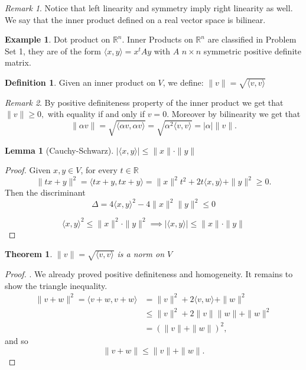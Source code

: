 \documentclass[11pt,openany]{book}
\theoremstyle{plain}
\newtheorem{theorem}{Theorem}[chapter]
\newtheorem{lemma}{Lemma}[chapter]
\theoremstyle{definition}
\newtheorem{definition}{Definition}[chapter]
\newtheorem{example}{Example}[chapter]
\theoremstyle{remark}
\newtheorem{remark}{Remark}[chapter]
\newcommand{\R}{\mathbb{R}}
\newcommand{\inner}[1]{\langle #1 \rangle}
\begin{document}
\begin{remark}\rm
Notice that left linearity and symmetry imply right linearity as well. We say that the inner product defined on a real vector space is bilinear.
\end{remark}
\begin{example}
    Dot product on $\mathbb R^n$. Inner Products on $\mathbb R^n$ are classified in Problem Set 1, they are of the form $\langle x, y\rangle=x^tAy$ with $A$ $n\times n$ symmetric positive definite matrix.
\end{example}
\begin{definition}
    Given an inner product on $V$, we define: $\|v\| = \sqrt{\langle v, v\rangle}$
\end{definition}

\begin{remark}\rm
By positive definiteness property of the inner product we get that $\|v\|\geq 0,$ with equality if and only if $v=0$. Moreover by bilinearity we get that
$$\|\alpha v\|=\sqrt{\langle \alpha v,\alpha v\rangle}=\sqrt{\alpha^2\langle v,v\rangle}=|\alpha| \|v\|.$$
\end{remark}

\begin{lemma}[Cauchy-Schwarz]
    $|\langle x,y \rangle| \le \|x\| \cdot \|y\|$    
\end{lemma}
\begin{proof} Given $x,y\in V$, for every $t\in \R$
    \[\|tx+y\|^2 = \langle tx+y, tx+y\rangle = \|x\|^2t^2+2t\langle x,y \rangle +\|y\|^2 \ge 0.\]
Then the discriminant   
    \[\Delta = 4 \langle x,y \rangle ^2 - 4\|x\|^2\|y\|^2 \leq  0 \]
    
    \[\langle x,y \rangle^2 \le \|x\|^2\cdot \|y\|^2 \implies |\langle x,y \rangle| \le \|x\|\cdot\|y\| \]
\end{proof}

\begin{theorem}
    $\|v\|=\sqrt{\langle v,v\rangle}$ is a norm on $V$
\end{theorem}

\begin{proof}.
    We already proved positive definiteness and homogeneity. It remains to show the triangle inequality.
 \begin{align*}
     \|v+w\|^2 = \inner{v+w, v+w} &= \|v\|^2+2\inner{v,w}+\|w\|^2 \\&\le \|v\|^2+2\|v\|\|w\|+\|w\|^2 \\
     &= (\|v\|+\|w\|)^2,
 \end{align*}
and so 
$$\|v+w\| \le \|v\|+\|w\|.$$
\end{proof}
\end{document}
